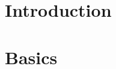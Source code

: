 \documentclass[12pt,a4paper,twoside]{report}
\theoremstyle{definition}
\begin{document}

    \parindent=0pt
    \linespread{1.2}
    \thispagestyle{plain}

%
    
	\begin{abstract}
		
	\end{abstract}
	\cleardoublepage
    
	\cleardoublepage
	
	
    \tableofcontents
    \cleardoublepage

    \setcounter{page}{1}
    \pagestyle{fancy}
 \normalsize

    
    \chapter{Introduction}

    \label{ch:Einleitung}    
    	
    \cleardoublepage
    
  	
    
    \chapter{Basics}
    \label{ch:Grundlagen}
		
    \cleardoublepage
\end{document}
